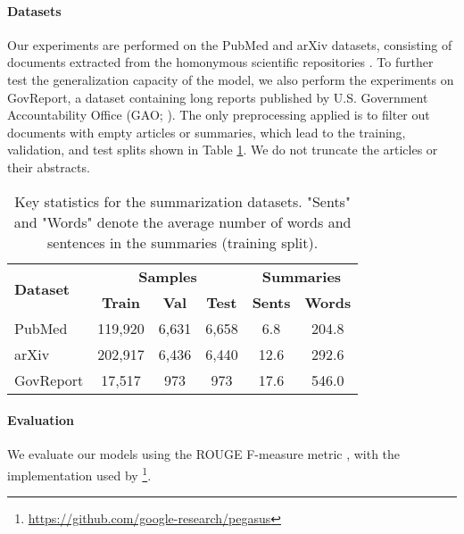 \documentclass[11pt,table]{article}
\begin{document}
\paragraph{Datasets}
Our experiments are performed on the PubMed and arXiv datasets, consisting of documents extracted from the homonymous scientific repositories \citep{cohan2018discourse}. To further test the generalization capacity of the model, we also perform the experiments on GovReport, a dataset containing long reports published by
U.S. Government Accountability Office (GAO; \citealt{huang2021efficient}). The only preprocessing applied is to filter out documents with empty articles or summaries, which lead to the training, validation, and test splits shown in Table \ref{tab:dataset_statistics}. We do not truncate the articles or their abstracts.
\begin{table}
  \setlength\tabcolsep{2.5pt}
  \centering
  \begin{tabular}{lccccc}
    \toprule
    \multicolumn{1}{l}{\multirow{2}{1cm}{\centering \textbf{Dataset}}} & \multicolumn{3}{c}{ \textbf{Samples}} & \multicolumn{2}{c}{ \textbf{Summaries}} \\
    \cmidrule(r){2-4} \cmidrule(r){5-6}
     &  \textbf{Train} &  \textbf{Val} &  \textbf{Test} &  \textbf{Sents} &  \textbf{Words} \\
    \midrule
    PubMed & 119,920 & 6,631 & 6,658 & 6.8 & 204.8 \\
    arXiv & 202,917 & 6,436 & 6,440 & 12.6 & 292.6 \\
    GovReport & 17,517 & 973 & 973 & 17.6 & 546.0  \\
    \bottomrule
  \end{tabular}
  \caption{Key statistics for the summarization datasets. "Sents" and "Words" denote the average number of words and sentences in the summaries (training split).}\label{tab:dataset_statistics}
\end{table}

\paragraph{Evaluation}
We evaluate our models using the ROUGE F-measure metric \citep{lin2004rouge}, with the implementation used by \footnote{\url{https://github.com/google-research/pegasus}}.
\end{document}
